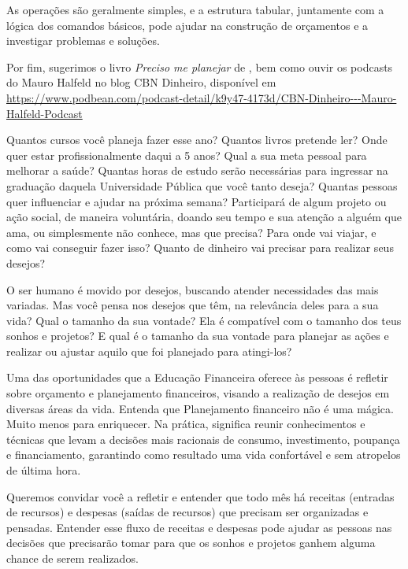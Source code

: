 \begin{paginatexto}
As operações são geralmente simples, e a estrutura tabular, juntamente com a lógica dos comandos básicos, pode ajudar na construção de orçamentos e a investigar problemas e soluções.

Por fim, sugerimos o livro \textit{Preciso me planejar} de \cite{zentgraf2015}, bem como ouvir os podcasts do Mauro Halfeld no blog CBN Dinheiro, disponível em \url{https://www.podbean.com/podcast-detail/k9y47-4173d/CBN-Dinheiro---Mauro-Halfeld-Podcast}

\end{paginatexto}

\label{fin-exp-2}

Quantos cursos você planeja fazer esse ano? Quantos livros pretende ler? Onde quer estar profissionalmente daqui a 5 anos? Qual a sua meta pessoal para melhorar a saúde? Quantas horas de estudo serão necessárias para ingressar na graduação daquela Universidade Pública que você tanto deseja? Quantas pessoas quer influenciar e ajudar na próxima semana? Participará de algum projeto ou ação social, de maneira voluntária, doando seu tempo e sua atenção a alguém que ama, ou simplesmente não conhece, mas que precisa? Para onde vai viajar, e como vai conseguir fazer isso? Quanto de dinheiro vai precisar para realizar seus desejos? 

O ser humano é movido por desejos, buscando atender necessidades das mais variadas. Mas você pensa nos desejos que têm, na relevância deles para a sua vida? Qual o tamanho da sua vontade? Ela é compatível com o tamanho dos teus sonhos e projetos? E qual é o tamanho da sua vontade para planejar as ações e realizar ou ajustar aquilo que foi planejado para atingi-los? 

Uma das oportunidades que a Educação Financeira oferece às pessoas é refletir sobre orçamento e planejamento financeiros, visando a realização de desejos em diversas áreas da vida. Entenda que Planejamento financeiro não é uma mágica. Muito menos para enriquecer. Na prática, significa reunir conhecimentos e técnicas que levam a decisões mais racionais de consumo, investimento, poupança e financiamento, garantindo como resultado uma vida confortável e sem atropelos de última hora.

Queremos convidar você a refletir e entender que todo mês há receitas (entradas de recursos) e despesas (saídas de recursos) que precisam ser organizadas e pensadas. Entender esse fluxo de receitas e despesas pode ajudar as pessoas nas decisões que precisarão tomar para que os sonhos e projetos ganhem alguma chance de serem realizados. 


